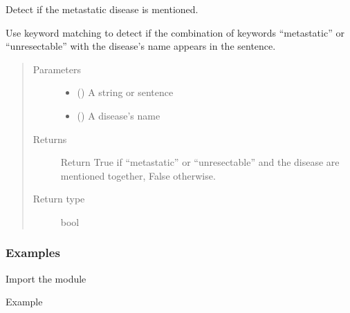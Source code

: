 \documentclass[letterpaper,10pt,english]{sphinxmanual}
\begin{document}
\begin{fulllineitems}
\label{\detokenize{biomarker_extraction:biomarker_extraction.is_metastatic}}
\sphinxAtStartPar
Detect if the metastatic disease is mentioned.

\sphinxAtStartPar
Use keyword matching to detect if the combination of keywords “metastatic” or “unresectable” with the disease’s name appears in the sentence.
\begin{quote}\begin{description}
\item[{Parameters}] \leavevmode\begin{itemize}
\item {} 
\sphinxAtStartPar
{} () \textendash{} A string or sentence

\item {} 
\sphinxAtStartPar
{} () \textendash{} A disease’s name

\end{itemize}

\item[{Returns}] \leavevmode
\sphinxAtStartPar
Return True if “metastatic” or “unresectable” and the disease are mentioned together, False otherwise.

\item[{Return type}] \leavevmode
\sphinxAtStartPar
bool

\end{description}\end{quote}
\subsubsection*{Examples}

\sphinxAtStartPar
Import the module

\begin{sphinxVerbatim}[commandchars=\\\{\}]
   
\end{sphinxVerbatim}

\sphinxAtStartPar
Example


\end{fulllineitems}
\end{document}
